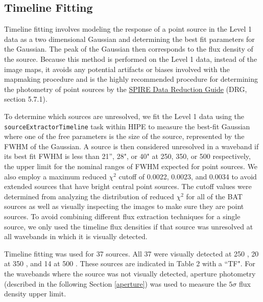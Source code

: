 \subsection{Timeline Fitting}\label{timeline}
Timeline fitting involves modeling the response of a point source in the Level 1 data as a two dimensional Gaussian and determining the best fit parameters for the Gaussian. The peak of the Gaussian then corresponds to the flux density of the source. Because this method is performed on the Level 1 data, instead of the image maps, it avoids any potential artifacts or biases involved with the mapmaking procedure and is the highly recommended procedure for determining the photometry of point sources by the \href{http://herschel.esac.esa.int/hcss-doc-11.0/index.jsp\#spire_drg:_start}{SPIRE Data Reduction Guide} (DRG, section 5.7.1).

To determine which sources are unresolved, we fit the Level 1 data using the \texttt{sourceExtractorTimeline} task within HIPE to measure the best-fit Gaussian where one of the free parameters is the size of the source, represented by the FWHM of the Gaussian. A source is then considered unresolved in a waveband if its best fit FWHM is less than 21'', 28", or 40" at 250, 350, or 500 \um{} respectively, the upper limit for the nominal ranges of FWHM expected for point sources. We also employ a maximum reduced $\chi^{2}$ cutoff of 0.0022, 0.0023, and 0.0034 to avoid extended sources that have bright central point sources. The cutoff values were determined from analyzing the distribution of reduced $\chi^{2}$ for all of the BAT sources as well as visually inspecting the images to make sure they are point sources. To avoid combining different flux extraction techniques for a single source, we only used the timeline flux densities if that source was unresolved at all wavebands in which it is visually detected.

Timeline fitting was used for 37 sources. All 37 were visually detected at 250 \um{}, 20 at 350 \um{}, and 14 at 500 \um. These sources are indicated in Table 2 with a ``TF". For the wavebands where the source was not visually detected, aperture photometry (described in the following Section \ref{aperture}) was used to measure the $5\sigma$ flux density upper limit.
